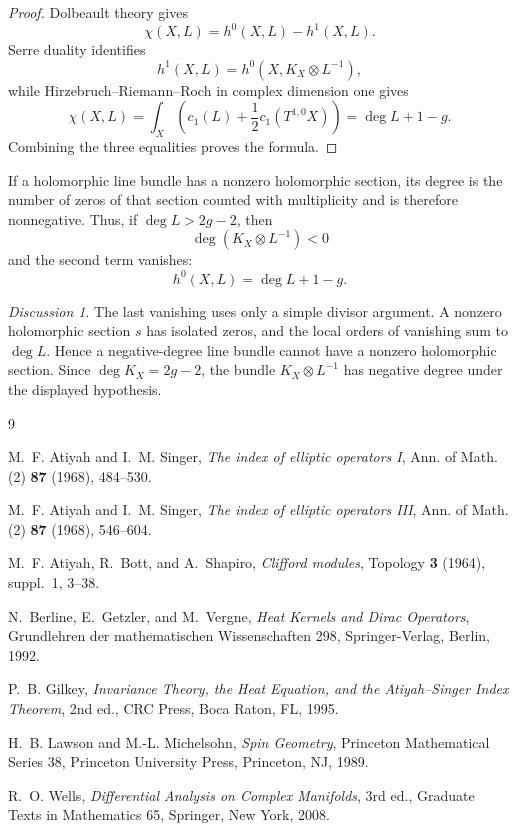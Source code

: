 \documentclass[11pt,oneside,reqno]{book}
\theoremstyle{plain}
\theoremstyle{definition}
\theoremstyle{remark}
\newtheorem*{discussion}{Discussion}
\begin{document}
\begin{proof}
Dolbeault theory gives
\[
 \chi(X,L)=h^0(X,L)-h^1(X,L).
\]
Serre duality identifies
\[
 h^1(X,L)=h^0(X,K_X\otimes L^{-1}),
\]
while Hirzebruch--Riemann--Roch in complex dimension one gives
\[
 \chi(X,L)
 =\int_X\left(c_1(L)+\frac12c_1(T^{1,0}X)\right)
 =\deg L+1-g.
\]
Combining the three equalities proves the formula.
\end{proof}

If a holomorphic line bundle has a nonzero holomorphic section, its degree
is the number of zeros of that section counted with multiplicity and is
therefore nonnegative. Thus, if \(\deg L>2g-2\), then
\[
 \deg(K_X\otimes L^{-1})<0
\]
and the second term vanishes:
\[
 h^0(X,L)=\deg L+1-g.
\]

\begin{discussion}
The last vanishing uses only a simple divisor argument. A nonzero
holomorphic section \(s\) has isolated zeros, and the local orders of
vanishing sum to \(\deg L\). Hence a negative-degree line bundle cannot
have a nonzero holomorphic section. Since
\(\deg K_X=2g-2\), the bundle \(K_X\otimes L^{-1}\) has negative degree
under the displayed hypothesis.
\end{discussion}


\backmatter
\begin{thebibliography}{9}

M.~F. Atiyah and I.~M. Singer,
\emph{The index of elliptic operators I},
Ann. of Math. (2) \textbf{87} (1968), 484--530.

M.~F. Atiyah and I.~M. Singer,
\emph{The index of elliptic operators III},
Ann. of Math. (2) \textbf{87} (1968), 546--604.

M.~F. Atiyah, R.~Bott, and A.~Shapiro,
\emph{Clifford modules},
Topology \textbf{3} (1964), suppl.~1, 3--38.

N.~Berline, E.~Getzler, and M.~Vergne,
\emph{Heat Kernels and Dirac Operators},
Grundlehren der mathematischen Wissenschaften 298,
Springer-Verlag, Berlin, 1992.

P.~B. Gilkey,
\emph{Invariance Theory, the Heat Equation, and the Atiyah--Singer Index
Theorem}, 2nd ed., CRC Press, Boca Raton, FL, 1995.

H.~B. Lawson and M.-L. Michelsohn,
\emph{Spin Geometry},
Princeton Mathematical Series 38, Princeton University Press, Princeton,
NJ, 1989.

R.~O. Wells,
\emph{Differential Analysis on Complex Manifolds}, 3rd ed.,
Graduate Texts in Mathematics 65, Springer, New York, 2008.

\end{thebibliography}
\end{document}
